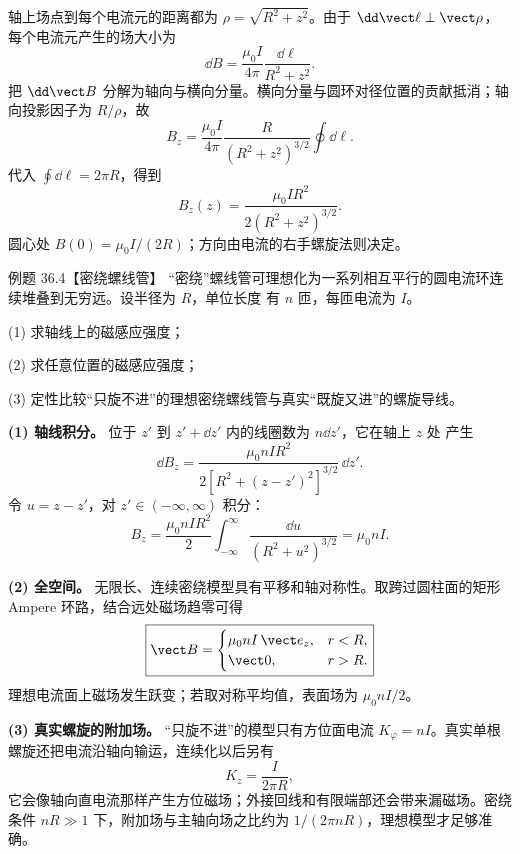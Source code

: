 \begin{xesolution}
轴上场点到每个电流元的距离都为 $\rho=\sqrt{R^2+z^2}$。由于
$\dd\vect\ell\perp\vect\rho$，每个电流元产生的场大小为
\[
  \dd B=\frac{\mu_0I}{4\pi}\frac{\dd\ell}{R^2+z^2}.
\]
把 $\dd\vect B$ 分解为轴向与横向分量。横向分量与圆环对径位置的贡献抵消；轴向投影因子为
$R/\rho$，故
\[
  B_z=\frac{\mu_0I}{4\pi}
  \frac{R}{(R^2+z^2)^{3/2}}\oint\dd\ell.
\]
代入 $\oint\dd\ell=2\pi R$，得到
\begin{equation}
  \boxed{B_z(z)=\frac{\mu_0IR^2}{2(R^2+z^2)^{3/2}}}.
\end{equation}
圆心处 $B(0)=\mu_0I/(2R)$；方向由电流的右手螺旋法则决定。

\loopAxisDiagram
\end{xesolution}

\Needspace{0.18\textheight}
\begin{origexamplebox}{例题 36.4【密绕螺线管】}
“密绕”螺线管可理想化为一系列相互平行的圆电流环连续堆叠到无穷远。设半径为 $R$，单位长度
有 $n$ 匝，每匝电流为 $I$。

(1) 求轴线上的磁感应强度；

(2) 求任意位置的磁感应强度；

(3) 定性比较“只旋不进”的理想密绕螺线管与真实“既旋又进”的螺旋导线。
\end{origexamplebox}

\begin{xesolution}
\textbf{(1) 轴线积分。} 位于 $z'$ 到 $z'+\dd z'$ 内的线圈数为 $n\dd z'$，它在轴上 $z$ 处
产生
\[
  \dd B_z=\frac{\mu_0nIR^2}{2[R^2+(z-z')^2]^{3/2}}\,\dd z'.
\]
令 $u=z-z'$，对 $z'\in(-\infty,\infty)$ 积分：
\[
  B_z=\frac{\mu_0nIR^2}{2}
  \int_{-\infty}^{\infty}\frac{\dd u}{(R^2+u^2)^{3/2}}
  =\boxed{\mu_0nI}.
\]

\textbf{(2) 全空间。} 无限长、连续密绕模型具有平移和轴对称性。取跨过圆柱面的矩形 Ampere
环路，结合远处磁场趋零可得
\begin{equation}
  \boxed{\vect B=
  \begin{cases}
    \mu_0nI\,\vect e_z,&r<R,\\
    \vect0,&r>R.
  \end{cases}}
\end{equation}
理想电流面上磁场发生跃变；若取对称平均值，表面场为 $\mu_0nI/2$。

\textbf{(3) 真实螺旋的附加场。} “只旋不进”的模型只有方位面电流
$K_\varphi=nI$。真实单根螺旋还把电流沿轴向输运，连续化以后另有
\[
  K_z=\frac{I}{2\pi R},
\]
它会像轴向直电流那样产生方位磁场；外接回线和有限端部还会带来漏磁场。密绕条件
$nR\gg1$ 下，附加场与主轴向场之比约为 $1/(2\pi nR)$，理想模型才足够准确。

\idealHelixDiagram
\end{xesolution}

